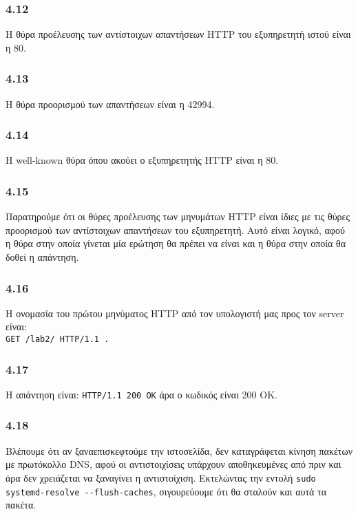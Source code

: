		\subsubsection*{4.12}
			Η θύρα προέλευσης των αντίστοιχων απαντήσεων HTTP του εξυπηρετητή ιστού είναι η 80.
		
		\subsubsection*{4.13}
			Η θύρα προορισμού των απαντήσεων είναι η 42994.
		
		\subsubsection*{4.14}
			Η well-known θύρα όπου ακούει ο εξυπηρετητής HTTP είναι η 80.
	
		\subsubsection*{4.15}
			Παρατηρούμε ότι οι θύρες προέλευσης των μηνυμάτων HTTP είναι ίδιες με τις θύρες προορισμού των αντίστοιχων απαντήσεων του εξυπηρετητή. Αυτό είναι λογικό, αφού η θύρα στην οποία γίνεται μία ερώτηση θα πρέπει να είναι και η θύρα στην οποία θα δοθεί η απάντηση.
		
		\subsubsection*{4.16}
			Η ονομασία του πρώτου μηνύματος HTTP από τον υπολογιστή μας προς τον server είναι: \\
			\verb|GET /lab2/ HTTP/1.1 .|
		
		\subsubsection*{4.17}
			Η απάντηση είναι: \verb|HTTP/1.1 200 OK| άρα ο κωδικός είναι 200 OK.
		
		\subsubsection*{4.18}
			Βλέπουμε ότι αν ξαναεπισκεφτούμε την ιστοσελίδα, δεν καταγράφεται κίνηση πακέτων με πρωτόκολλο DNS, αφού οι αντιστοιχίσεις υπάρχουν αποθηκευμένες από πριν και άρα δεν χρειάζεται να ξαναγίνει η αντιστοίχιση. Εκτελώντας την εντολή \verb|sudo systemd-resolve --flush-caches|, σιγουρεύουμε ότι θα σταλούν και αυτά τα πακέτα.


